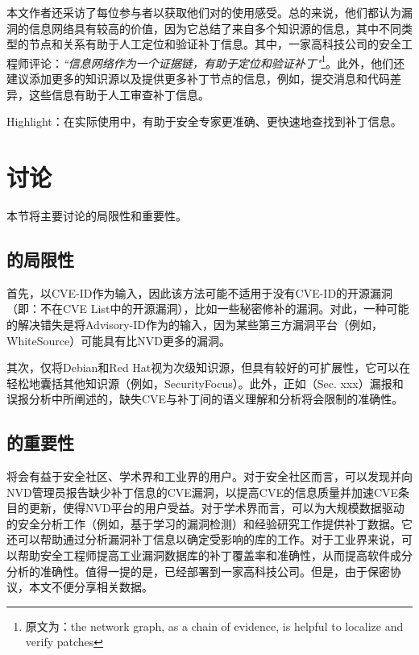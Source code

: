 本文作者还采访了每位参与者以获取他们对\tool 的使用感受。总的来说，他们都认为漏洞的信息网络具有较高的价值，因为它总结了来自多个知识源的信息，其中不同类型的节点和关系有助于人工定位和验证补丁信息。其中，一家高科技公司的安全工程师评论：\textit{``信息网络作为一个证据链，有助于定位和验证补丁"}\footnote{原文为：the network graph, as a chain of evidence, is helpful to localize and verify patches}。此外，他们还建议\tool 添加更多的知识源以及提供更多补丁节点的信息，例如，提交消息和代码差异，这些信息有助于人工审查补丁信息。

\begin{tcolorbox}[size=title,opacityfill=0.15]
Highlight：在实际使用中，\tool 有助于安全专家更准确、更快速地查找到补丁信息。
\end{tcolorbox}

\section{讨论}
本节将主要讨论\tool 的局限性和重要性。
\subsection{\tool 的局限性}
首先，\tool 以CVE-ID作为输入，因此该方法可能不适用于没有CVE-ID的开源漏洞（即：不在CVE List中的开源漏洞），比如一些秘密修补的漏洞\cite{xu2017spain}。对此，一种可能的解决错失是将Advisory-ID作为\tool 的输入，因为某些第三方漏洞平台（例如，WhiteSource）可能具有比NVD更多的漏洞。

其次，\tool 仅将Debian和Red Hat视为次级知识源，但\tool 具有较好的可扩展性，它可以在轻松地囊括其他知识源（例如，SecurityFocus\cite{SecurityFocus}）。此外，正如（Sec. xxx）\tool 漏报和误报分析中所阐述的，缺失CVE与补丁间的语义理解和分析将会限制\tool 的准确性。%

\subsection{\tool 的重要性}
\tool 将会有益于安全社区、学术界和工业界的用户。对于安全社区而言，\tool 可以发现并向NVD管理员报告缺少补丁信息的CVE漏洞，以提高CVE的信息质量并加速CVE条目的更新，使得NVD平台的用户受益。对于学术界而言，\tool 可以为大规模数据驱动的安全分析工作（例如，基于学习的漏洞检测\cite{li2018vuldeepecker,zhou2019devign}）和经验研究工作提供补丁数据。它还可以帮助通过分析漏洞补丁信息以确定受影响的库的工作\cite{dong2019towards}。对于工业界来说，\tool 可以帮助安全工程师提高工业漏洞数据库的补丁覆盖率和准确性，从而提高软件成分分析的准确性。值得一提的是，\tool 已经部署到一家高科技公司。但是，由于保密协议，本文不便分享相关数据。